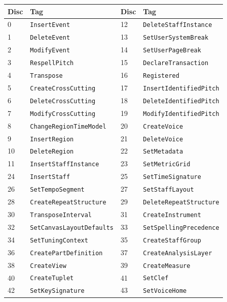 \documentclass[11pt,letterpaper]{report}
\newcommand{\tablenums}[1]{{\addfontfeatures{Numbers={Lining,Tabular}}#1}}
\begin{document}
\begingroup\small
\begin{longtable}{p{0.5in} p{2.0in} p{0.5in} p{2.0in}}
  \toprule
  \textbf{Disc} & \textbf{Tag} & \textbf{Disc} & \textbf{Tag} \\
  \midrule
  \endhead
  \tablenums{0} & \texttt{InsertEvent} & \tablenums{12} & \texttt{DeleteStaffInstance} \\
  \tablenums{1} & \texttt{DeleteEvent} & \tablenums{13} & \texttt{SetUserSystemBreak} \\
  \tablenums{2} & \texttt{ModifyEvent} & \tablenums{14} & \texttt{SetUserPageBreak} \\
  \tablenums{3} & \texttt{RespellPitch} & \tablenums{15} & \texttt{DeclareTransaction} \\
  \tablenums{4} & \texttt{Transpose} & \tablenums{16} & \texttt{Registered} \\
  \tablenums{5} & \texttt{CreateCrossCutting} & \tablenums{17} & \texttt{InsertIdentifiedPitch} \\
  \tablenums{6} & \texttt{DeleteCrossCutting} & \tablenums{18} & \texttt{DeleteIdentifiedPitch} \\
  \tablenums{7} & \texttt{ModifyCrossCutting} & \tablenums{19} & \texttt{ModifyIdentifiedPitch} \\
  \tablenums{8} & \texttt{ChangeRegionTimeModel} & \tablenums{20} & \texttt{CreateVoice} \\
  \tablenums{9} & \texttt{InsertRegion} & \tablenums{21} & \texttt{DeleteVoice} \\
  \tablenums{10} & \texttt{DeleteRegion} & \tablenums{22} & \texttt{SetMetadata} \\
  \tablenums{11} & \texttt{InsertStaffInstance} & \tablenums{23} & \texttt{SetMetricGrid} \\
  \tablenums{24} & \texttt{InsertStaff} & \tablenums{25} & \texttt{SetTimeSignature} \\
  \tablenums{26} & \texttt{SetTempoSegment} & \tablenums{27} & \texttt{SetStaffLayout} \\
  \tablenums{28} & \texttt{CreateRepeatStructure} & \tablenums{29} & \texttt{DeleteRepeatStructure} \\
  \tablenums{30} & \texttt{TransposeInterval} & \tablenums{31} & \texttt{CreateInstrument} \\
  \tablenums{32} & \texttt{SetCanvasLayoutDefaults} & \tablenums{33} & \texttt{SetSpellingPrecedence} \\
  \tablenums{34} & \texttt{SetTuningContext} & \tablenums{35} & \texttt{CreateStaffGroup} \\
  \tablenums{36} & \texttt{CreatePartDefinition} & \tablenums{37} & \texttt{CreateAnalysisLayer} \\
  \tablenums{38} & \texttt{CreateView} & \tablenums{39} & \texttt{CreateMeasure} \\
  \tablenums{40} & \texttt{CreateTuplet} & \tablenums{41} & \texttt{SetClef} \\
  \tablenums{42} & \texttt{SetKeySignature} & \tablenums{43} & \texttt{SetVoiceHome} \\
  \bottomrule
\end{longtable}
\endgroup
\end{document}
